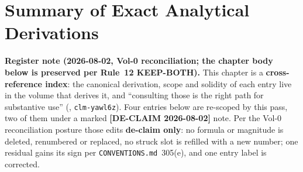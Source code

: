 \chapter{Summary of Exact Analytical Derivations}
\label{ch:analytical_summaries}

\noindent\textbf{Register note (2026-08-02, Vol-0 reconciliation; the chapter body below is preserved per Rule~12 KEEP-BOTH).} This chapter is a \textbf{cross-reference index}: the canonical derivation, scope and solidity of each entry live in the volume that derives it, and ``consulting those is the right path for substantive use'' (, \texttt{clm-yawl6z}). Four entries below are re-scoped by this pass, two of them under a marked \textbf{[DE-CLAIM 2026-08-02]} note. Per the Vol-0 reconciliation posture those edits \textbf{de-claim only}: no formula or magnitude is deleted, renumbered or replaced, no struck slot is refilled with a new number; one residual gains its sign per \texttt{CONVENTIONS.md}~305(e), and one entry label is corrected.

